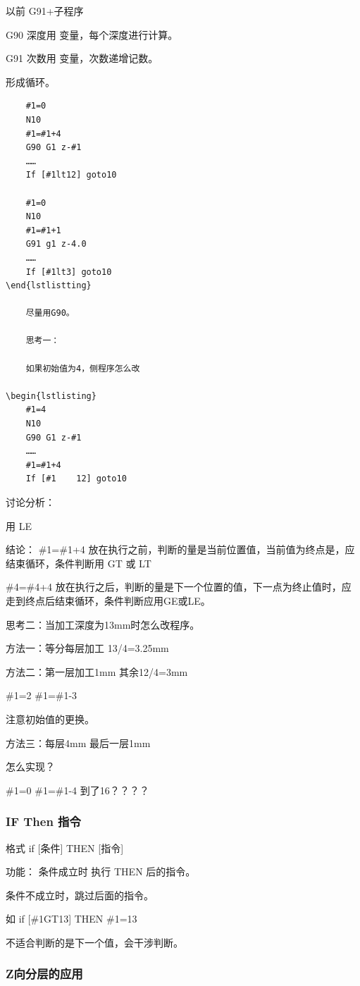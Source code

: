	以前 G91+子程序
	
	G90 深度用 变量，每个深度进行计算。
	
	G91 次数用 变量，次数递增记数。
	
	形成循环。

\begin{lstlisting}
	#1=0
	N10 
	#1=#1+4
	G90 G1 z-#1
	……
	If [#1lt12] goto10
	
	#1=0
	N10
	#1=#1+1
	G91 g1 z-4.0
	……
	If [#1lt3] goto10
\end{lstlistting}	
	
	尽量用G90。
	
	思考一：

	如果初始值为4，侧程序怎么改

\begin{lstlisting}	
	#1=4
	N10 
	G90 G1 z-#1
	……
	#1=#1+4
	If [#1    12] goto10
\end{lstlisting}

	讨论分析：

	用  LE  

	结论： \#1=\#1+4 放在执行之前，判断的量是当前位置值，当前值为终点是，应结束循环，条件判断用 GT 或 LT

	\#4=\#4+4 放在执行之后，判断的量是下一个位置的值，下一点为终止值时，应走到终点后结束循环，条件判断应用GE或LE。

	思考二：当加工深度为13mm时怎么改程序。

	方法一：等分每层加工 13/4=3.25mm

	方法二：第一层加工1mm 其余12/4=3mm

	\#1=2    \#1=\#1-3

	注意初始值的更换。

	方法三：每层4mm 最后一层1mm

	怎么实现？

	\#1=0  \#1=\#1-4  到了16？？？？

\subsubsection{IF  Then 指令}

	格式  if [条件] THEN [指令]

	功能： 条件成立时 执行 THEN 后的指令。

	条件不成立时，跳过后面的指令。

	如 if [\#1GT13] THEN \#1=13

	不适合判断的是下一个值，会干涉判断。

\subsubsection{Z向分层的应用}

